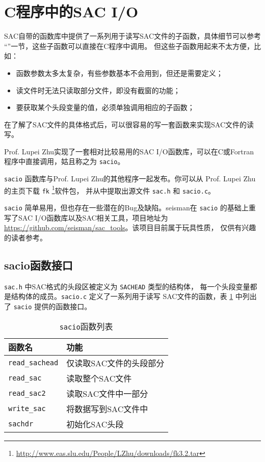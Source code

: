 \section{C程序中的SAC I/O}
SAC自带的函数库中提供了一系列用于读写SAC文件的子函数，具体细节可以参考
``''一节，这些子函数可以直接在C程序中调用。
但这些子函数用起来不太方便，比如：
\begin{itemize}
\item 函数参数太多太复杂，有些参数基本不会用到，但还是需要定义；
\item 读文件时无法只读取部分文件，即没有截窗的功能；
\item 要获取某个头段变量的值，必须单独调用相应的子函数；
\end{itemize}

在了解了SAC文件的具体格式后，可以很容易的写一套函数来实现SAC文件的读写。

Prof. Lupei Zhu实现了一套相对比较易用的SAC I/O函数库，可以在C或Fortran
程序中直接调用，姑且称之为 \texttt{sacio}。

\texttt{sacio} 函数库与Prof. Lupei Zhu的其他程序一起发布。你可以从
Prof. Lupei Zhu的主页下载 \texttt{fk} \footnote{
\url{http://www.eas.slu.edu/People/LZhu/downloads/fk3.2.tar}}软件包，
并从中提取出源文件 \texttt{sac.h} 和 \texttt{sacio.c}。

\texttt{sacio} 简单易用，但也存在一些潜在的Bug及缺陷。seisman在
\texttt{sacio} 的基础上重写了SAC I/O函数库以及SAC相关工具，项目地址为
\url{https://github.com/seisman/sac_tools}。该项目目前属于玩具性质，
仅供有兴趣的读者参考。

\subsection{sacio函数接口}
\texttt{sac.h} 中SAC格式的头段区被定义为 \texttt{SACHEAD} 类型的结构体，
每一个头段变量都是结构体的成员。\texttt{sacio.c} 定义了一系列用于读写
SAC文件的函数，表 \ref{table:sacio-function} 中列出了 \texttt{sacio}
提供的函数接口。

\begin{table}[H]
\centering
\caption{\texttt{sacio}函数列表}
\label{table:sacio-function}
\begin{tabular}{ll}
\toprule
函数名      &   功能        \\
\midrule
\verb|read_sachead|      &   仅读取SAC文件的头段部分 \\
\verb|read_sac|          &   读取整个SAC文件 \\
\verb|read_sac2|         &   读取SAC文件中一部分 \\
\verb|write_sac|         &   将数据写到SAC文件中 \\
\verb|sachdr|            &   初始化SAC头段\\
\bottomrule
\end{tabular}
\end{table}

